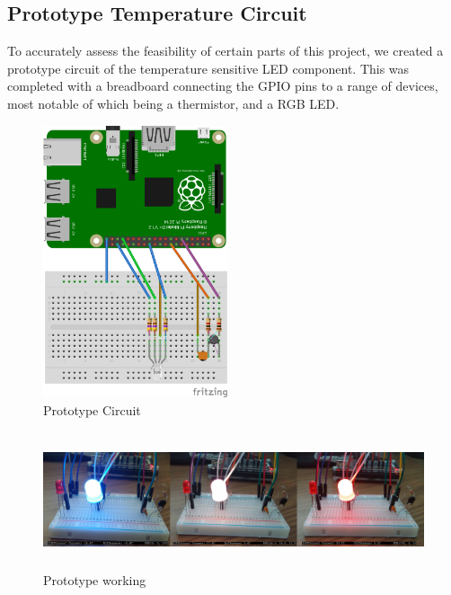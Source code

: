 \documentclass[10pt]{article}
\begin{document}
{\newpage
\subsection{Prototype Temperature Circuit}
To accurately assess the feasibility of certain parts of this project, we created a prototype circuit of the temperature sensitive LED component. This was completed with a breadboard connecting the GPIO pins to a range of devices, most notable of which being a thermistor, and a RGB LED.

\begin{figure}[h]
\centering
\caption{Prototype Circuit}
\label{Prototype Circuit}
\includegraphics[height=8cm]{images/prototypeDiagram.png}
\end{figure}

\begin{figure}[h]
\centering
\caption{Prototype working}
\label{Prototype working}
\includegraphics[height=4cm]{images/tempsenproto.png}
\end{figure}
\pagebreak
}
\end{document}
